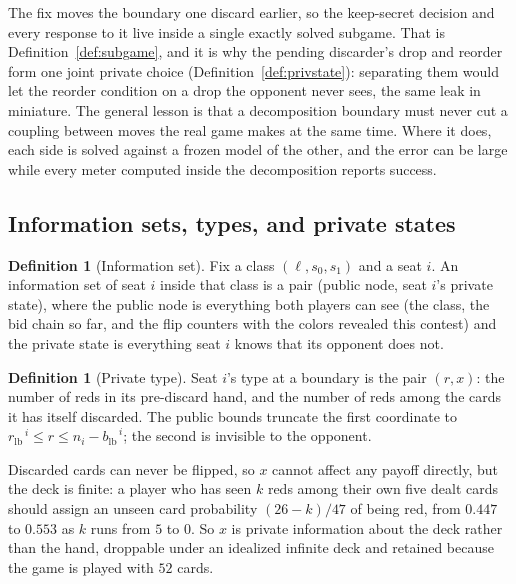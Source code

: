 \documentclass[11pt]{article}
\theoremstyle{plain}
\theoremstyle{definition}
\newtheorem{definition}[theorem]{Definition}
\theoremstyle{remark}
\newcommand{\rlb}{\ensuremath{r_{\mathrm{lb}}}}
\newcommand{\blb}{\ensuremath{b_{\mathrm{lb}}}}
\begin{document}
The fix moves the boundary one discard earlier, so the keep-secret decision and
every response to it live inside a single exactly solved subgame. That is
Definition~\ref{def:subgame}, and it is why the pending discarder's drop and
reorder form one joint private choice (Definition~\ref{def:privstate}):
separating them would let the reorder condition on a drop the opponent never
sees, the same leak in miniature. The general lesson is that a decomposition
boundary must never cut a coupling between moves the real game makes at the same
time. Where it does, each side is solved against a frozen model of the other,
and the error can be large while every meter computed inside the decomposition
reports success.

\subsection{Information sets, types, and private states}\label{sec:info}

\begin{definition}[Information set]\label{def:infoset}
Fix a class $(\ell,s_0,s_1)$ and a seat $i$. An information set of seat
$i$ inside that class is a pair (public node, seat $i$'s private state),
where the public node is everything both players can see (the class, the
bid chain so far, and the flip counters with the colors revealed this
contest) and the private state is everything seat $i$ knows that its
opponent does not.
\end{definition}

\begin{definition}[Private type]\label{def:type}
Seat $i$'s type at a boundary is the pair $(r,x)$: the number of reds in
its pre-discard hand, and the number of reds among the cards it has
itself discarded. The public bounds truncate the first coordinate to
$\rlb^{\,i}\le r\le n_i-\blb^{\,i}$; the second is invisible to the
opponent.
\end{definition}

Discarded cards can never be flipped, so $x$ cannot affect any payoff directly,
but the deck is finite: a player who has seen $k$ reds among their own five
dealt cards should assign an unseen card probability $(26-k)/47$ of being red,
from $0.447$ to $0.553$ as $k$ runs from $5$ to $0$. So $x$ is private
information about the deck rather than the hand, droppable under an idealized
infinite deck and retained because the game is played with $52$ cards.
\end{document}
